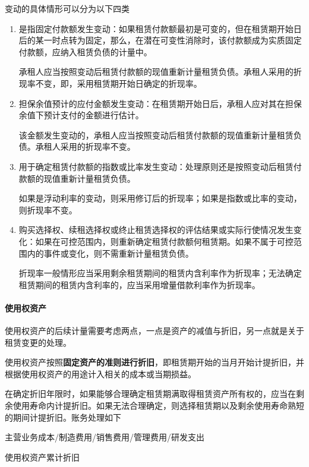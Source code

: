 \documentclass[UTF8,12pt]{ctexart}
\newenvironment{Dr}{%
	\begin{list}{}%
		{
			\setlength{\leftmargin}{2em}
			\setlength{\labelwidth}{2em}
			\setlength{\labelsep}{0pt}
			\setlength{\itemindent}{0pt}
			\setlength{\listparindent}{0pt}
			\setlength{\parsep}{0pt}
			\setlength{\topsep}{0pt}
		}
		\item[\textbf{借：}]
	}{%
	\end{list}
}
\newenvironment{Cr}{%
	\begin{list}{}%
		{
			\setlength{\leftmargin}{3em}
			\setlength{\labelwidth}{2em}
			\setlength{\labelsep}{0pt}
			\setlength{\itemindent}{0pt}
			\setlength{\listparindent}{0pt}
			\setlength{\parsep}{0pt}
			\setlength{\topsep}{0pt}
		}
		\item[\textbf{贷：}]
	}{%
	\end{list}
}
\numberwithin{equation}{section} %
\numberwithin{figure}{section}
\numberwithin{table}{section}
\begin{document}
	变动的具体情形可以分为以下四类
	\begin{enumerate}
		\item 是指固定付款额发生变动：如果租赁付款额最初是可变的，但在租赁期开始日后的某一时点转为固定，那么，在潜在可变性消除时，该付款额成为实质固定付款额，应纳入租赁负债的计量中。
		
		承租人应当按照变动后租赁付款额的现值重新计量租赁负债。承租人采用的折现率不变，即，采用租赁期开始日确定的折现率。
		
		\item 担保余值预计的应付金额发生变动：在租赁期开始日后，承租人应对其在担保余值下预计支付的金额进行估计。
		
		该金额发生变动的，承租人应当按照变动后租赁付款额的现值重新计量租赁负债。承租人采用的折现率不变。
		
		\item 用于确定租赁付款额的指数或比率发生变动：处理原则还是按照变动后租赁付款额的现值重新计量租赁负债。
		
		如果是浮动利率的变动，则采用修订后的折现率；如果是指数或比率的变动，则折现率不变。
		
		\item 购买选择权、续租选择权或终止租赁选择权的评估结果或实际行使情况发生变化：如果在可控范围内，则重新确定租赁付款额何租赁期。如果不属于可控范围内的事件或变化，则不需重新计量租赁负债。
		
		折现率一般情形应当采用剩余租赁期间的租赁内含利率作为折现率；无法确定租赁期间的租赁内含利率的，应当采用增量借款利率作为折现率。
	\end{enumerate}
	
	\paragraph{使用权资产}
	使用权资产的后续计量需要考虑两点，一点是资产的减值与折旧，另一点就是关于租赁变更的处理。
	
	使用权资产按照\textbf{固定资产的准则进行折旧}，即租赁期开始的当月开始计提折旧，并根据使用权资产的用途计入相关的成本或当期损益。
	
	在确定折旧年限时，如果能够合理确定租赁期满取得租赁资产所有权的，应当在剩余使用寿命内计提折旧。如果无法合理确定，则选择租赁期以及剩余使用寿命熟短的期间计提折旧。账务处理如下
	
	\begin{Dr}
		主营业务成本/制造费用/销售费用/管理费用/研发支出
	\end{Dr}
	\begin{Cr}
		使用权资产累计折旧
	\end{Cr}
\end{document}
